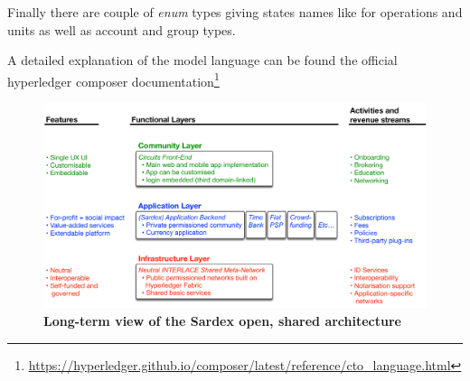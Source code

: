 Finally there are couple of \textit{enum} types giving states names like for operations and units as well as account and group types.

A detailed explanation of the model language can be found the official hyperledger composer documentation\footnote{\url{https://hyperledger.github.io/composer/latest/reference/cto_language.html}}


\begin{figure}[h]
\centering
\includegraphics[width=17 cm]{Figures/Open_Shared_Architecture}
\caption{\bf \small Long-term view of the Sardex open, shared architecture}
\label{fig:OpenArchitecture}
\end{figure}
































\newpage











